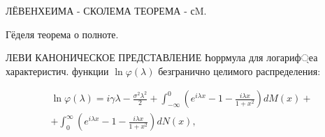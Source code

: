 \documentclass[10pt]{article}
\begin{document}
ЛЁВЕНХЕИМА - СКОЛЕМА ТЕОРЕМА - сM.



Гёделя теорема о полноте.



ЛЕВИ КАНОНИЧЕСКОЕ ПРЕДСТАВЛЕНИЕ Һоррмула для логариф্еа характеристич. функции $\ln \varphi(\lambda)$ безгранично целимого распределения:



\[

\begin{gathered}

\ln \varphi(\lambda)=i \gamma \lambda-\frac{\sigma^{2} \lambda^{2}}{2}+\int_{-\infty}^{0}\left(e^{i \lambda x}-1-\frac{i \lambda x}{1+x^{2}}\right) d M(x)+ \\

+\int_{0}^{\infty}\left(e^{i \lambda x}-1-\frac{i \lambda x}{1+x^{2}}\right) d N(x),

\end{gathered}

\]
\end{document}
